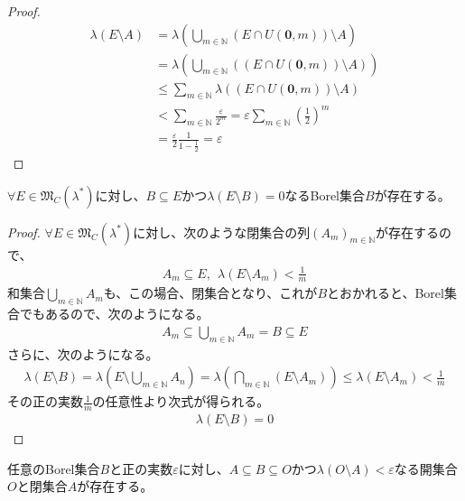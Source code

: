 \documentclass[dvipdfmx]{jsarticle}
\begin{document}
\begin{proof}
\begin{align*}
\lambda(E \setminus A) &= \lambda\left( \bigcup_{m \in \mathbb{N}} \left( E \cap U\left( \mathbf{0},m \right) \right) \setminus A \right)\\
&= \lambda\left( \bigcup_{m \in \mathbb{N}} \left( \left( E \cap U\left( \mathbf{0},m \right) \right) \setminus A \right) \right)\\
&\leq \sum_{m \in \mathbb{N}} {\lambda\left( \left( E \cap U\left( \mathbf{0},m \right) \right) \setminus A \right)}\\
&< \sum_{m \in \mathbb{N}} \frac{\varepsilon}{2^{m}} = \varepsilon\sum_{m \in \mathbb{N}} \left( \frac{1}{2} \right)^{m}\\
&= \frac{\varepsilon}{2}\frac{1}{1 - \frac{1}{2}} = \varepsilon
\end{align*}
\end{proof}
\begin{thm}\label{4.5.4.17}
$\forall E \in \mathfrak{M}_{C}\left( \lambda^{*} \right)$に対し、$B \subseteq E$かつ$\lambda(E \setminus B) = 0$なるBorel集合$B$が存在する。
\end{thm}
\begin{proof}
$\forall E \in \mathfrak{M}_{C}\left( \lambda^{*} \right)$に対し、次のような閉集合の列$\left( A_{m} \right)_{m \in \mathbb{N}}$が存在するので、
\begin{align*}
A_{m} \subseteq E,\ \ \lambda\left( E \setminus A_{m} \right) < \frac{1}{m}
\end{align*}
和集合$\bigcup_{m \in \mathbb{N}} A_{m}$も、この場合、閉集合となり、これが$B$とおかれると、Borel集合でもあるので、次のようになる。
\begin{align*}
A_{m} \subseteq \bigcup_{m \in \mathbb{N}} A_{m} = B \subseteq E
\end{align*}
さらに、次のようになる。
\begin{align*}
\lambda(E \setminus B) = \lambda\left( E \setminus \bigcup_{m \in \mathbb{N}} A_{n} \right) = \lambda\left( \bigcap_{m \in \mathbb{N}} \left( E \setminus A_{m} \right) \right) \leq \lambda\left( E \setminus A_{m} \right) < \frac{1}{m}
\end{align*}
その正の実数$\frac{1}{m}$の任意性より次式が得られる。
\begin{align*}
\lambda(E \setminus B) = 0
\end{align*}
\end{proof}
\begin{thm}\label{4.5.4.18}
任意のBorel集合$B$と正の実数$\varepsilon$に対し、$A \subseteq B \subseteq O$かつ$\lambda(O \setminus A) < \varepsilon$なる開集合$O$と閉集合$A$が存在する。
\end{thm}
\end{document}
